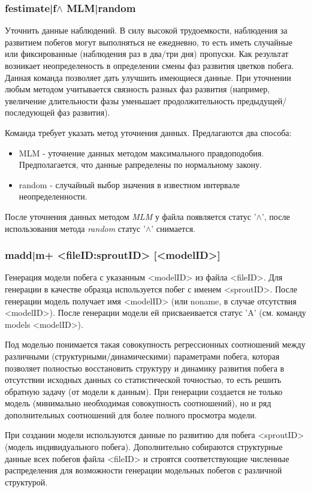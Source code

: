 \documentclass[a4paper]{article}
\begin{document}
\subsubsection{festimate|f$\wedge$ MLM|random}
Уточнить данные наблюдений. В силу высокой трудоемкости, наблюдения за развитием побегов могут выполняться не ежедневно, то есть иметь случайные или фиксированные (наблюдения раз в два/три дня) пропуски. Как результат возникает неопределеность в определении смены фаз развития цветков побега. Данная команда позволяет дать улучшить имеющиеся данные. При уточнении любым методом учитывается связность разных фаз развития (например, увеличение длительности фазы уменьшает продолжительность предыдущей/последующей фаз развития).

Команда требует указать метод уточнения данных. Предлагаются два способа:
\begin{itemize}
\item MLM - уточнение данных методом максимального правдоподобия. Предполагается, что данные рапределены по нормальному закону. 
\item random - случайный выбор значения в известном интервале неопределенности. 
\end{itemize}
После уточнения данных методом \textit{MLM} у файла появляется статус '$\wedge$', после использования метода \textit{random} статус '$\wedge$' снимается.

\subsubsection{madd|m+ <fileID:sproutID> [<modelID>]}
Генерация модели побега с указанным <modelID> из файла <fileID>. Для генерации в качестве образца используется побег с именем <sproutID>. После генерации модель получает имя <modelID> (или noname, в случае отсутствия <modelID>).
После генерации модели ей присваеивается статус 'A' (см. команду models <modelID>).

Под моделью понимается такая совокупность регрессионных соотношений между различными (структурными/динамическими) параметрами побега, которая позволяет полностью восстановить структуру и динамику развития побега в отсутствии исходных данных со статистической точностью, то есть решить обратную задачу (от модели к данным). При генерации создается не только модель (минимально необходимая совокупность соотношений), но и ряд дополнительных соотношений для более полного просмотра модели.  

При создании модели используются данные по развитию для побега <sproutID> (модель индивидуального побега). Дополнительно собираются структурные данные всех побегов файла <fileID> и строятся соответствующие численные распределения для возможности генерации модельных побегов с различной структурой.
\end{document}
